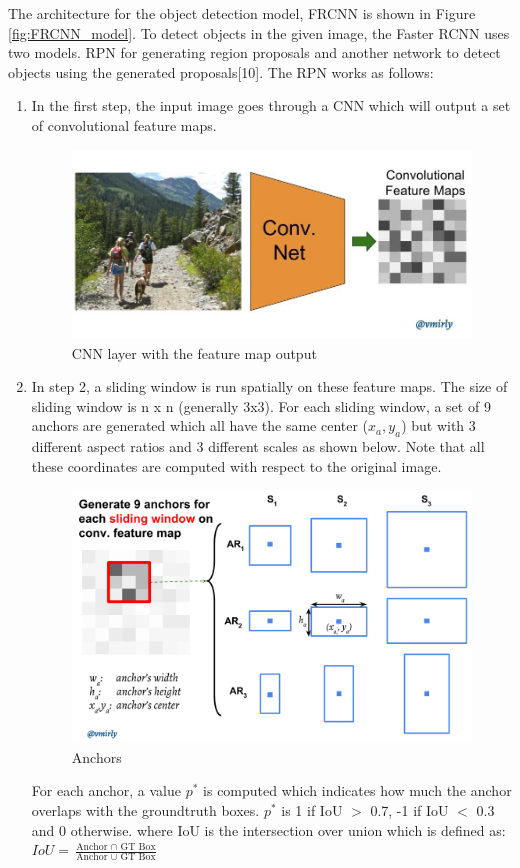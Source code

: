 \documentclass[12pt]{article}
\begin{document}
The architecture for the object detection model, FRCNN is shown in Figure \ref{fig:FRCNN_model}. To detect objects in the given image, the Faster RCNN uses two models. RPN for generating region proposals and another network to detect objects using the generated proposals[10]. The RPN works as follows:
\begin{enumerate}
	\item In the first step, the input image goes through a CNN which will output a set of convolutional feature maps. \begin{figure}[H]
\centering
  \includegraphics[width=0.5\linewidth]{./Images/RPN1.jpeg}
  \caption{CNN layer with the feature map output}
  \label{fig:RPN1}
\end{figure}
	
	\item In step 2, a sliding window is run spatially on these feature maps. The size of sliding window is n x n (generally 3x3). For each sliding window, a set of 9 anchors are generated which all have the same center ($x_a,y_a$) but with 3 different aspect ratios and 3 different scales as shown below. Note that all these coordinates are computed with respect to the original image.
\begin{figure}[H]
\centering
  \includegraphics[width=0.5\linewidth]{./Images/RPN2.png}
  \caption{Anchors}
  \label{fig:RPN2}
\end{figure}

For each anchor, a value $p^*$ is computed which indicates how much the anchor overlaps with the groundtruth boxes. $p^*$ is 1 if IoU $>$ 0.7, -1 if IoU $<$ 0.3 and 0 otherwise.
where IoU is the intersection over union which is defined as: $IoU = \frac{\text{Anchor $\cap$ GT Box}}{\text{Anchor $\cup$ GT Box}}$ 


\end{enumerate}
\end{document}
